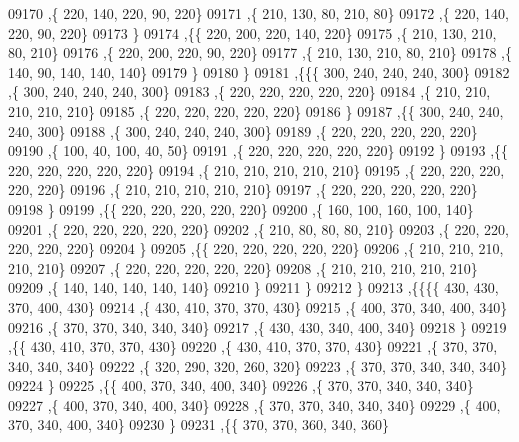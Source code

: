 \begin{DoxyCode}
09170     ,\{   220,   140,   220,    90,   220\}
09171     ,\{   210,   130,    80,   210,    80\}
09172     ,\{   220,   140,   220,    90,   220\}
09173     \}
09174    ,\{\{   220,   200,   220,   140,   220\}
09175     ,\{   210,   130,   210,    80,   210\}
09176     ,\{   220,   200,   220,    90,   220\}
09177     ,\{   210,   130,   210,    80,   210\}
09178     ,\{   140,    90,   140,   140,   140\}
09179     \}
09180    \}
09181   ,\{\{\{   300,   240,   240,   240,   300\}
09182     ,\{   300,   240,   240,   240,   300\}
09183     ,\{   220,   220,   220,   220,   220\}
09184     ,\{   210,   210,   210,   210,   210\}
09185     ,\{   220,   220,   220,   220,   220\}
09186     \}
09187    ,\{\{   300,   240,   240,   240,   300\}
09188     ,\{   300,   240,   240,   240,   300\}
09189     ,\{   220,   220,   220,   220,   220\}
09190     ,\{   100,    40,   100,    40,    50\}
09191     ,\{   220,   220,   220,   220,   220\}
09192     \}
09193    ,\{\{   220,   220,   220,   220,   220\}
09194     ,\{   210,   210,   210,   210,   210\}
09195     ,\{   220,   220,   220,   220,   220\}
09196     ,\{   210,   210,   210,   210,   210\}
09197     ,\{   220,   220,   220,   220,   220\}
09198     \}
09199    ,\{\{   220,   220,   220,   220,   220\}
09200     ,\{   160,   100,   160,   100,   140\}
09201     ,\{   220,   220,   220,   220,   220\}
09202     ,\{   210,    80,    80,    80,   210\}
09203     ,\{   220,   220,   220,   220,   220\}
09204     \}
09205    ,\{\{   220,   220,   220,   220,   220\}
09206     ,\{   210,   210,   210,   210,   210\}
09207     ,\{   220,   220,   220,   220,   220\}
09208     ,\{   210,   210,   210,   210,   210\}
09209     ,\{   140,   140,   140,   140,   140\}
09210     \}
09211    \}
09212   \}
09213  ,\{\{\{\{   430,   430,   370,   400,   430\}
09214     ,\{   430,   410,   370,   370,   430\}
09215     ,\{   400,   370,   340,   400,   340\}
09216     ,\{   370,   370,   340,   340,   340\}
09217     ,\{   430,   430,   340,   400,   340\}
09218     \}
09219    ,\{\{   430,   410,   370,   370,   430\}
09220     ,\{   430,   410,   370,   370,   430\}
09221     ,\{   370,   370,   340,   340,   340\}
09222     ,\{   320,   290,   320,   260,   320\}
09223     ,\{   370,   370,   340,   340,   340\}
09224     \}
09225    ,\{\{   400,   370,   340,   400,   340\}
09226     ,\{   370,   370,   340,   340,   340\}
09227     ,\{   400,   370,   340,   400,   340\}
09228     ,\{   370,   370,   340,   340,   340\}
09229     ,\{   400,   370,   340,   400,   340\}
09230     \}
09231    ,\{\{   370,   370,   360,   340,   360\}

\end{DoxyCode}
